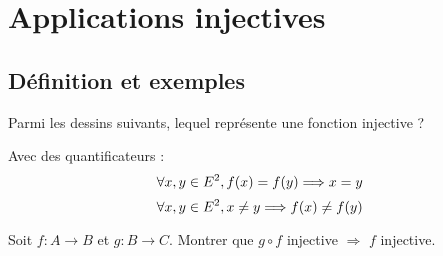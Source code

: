 \documentclass[a4paper, 11pt]{article}
\begin{document}
% 
\section{Applications injectives}

\subsection{D\'efinition et exemples}





\begin{exemple}
	Parmi les dessins suivants, lequel repr\'esente une fonction injective ? \\

\end{exemple}

Avec des quantificateurs :
$$\forall x, y \in E^2, f(x)= f(y) \Longrightarrow x= y$$
$$\forall x, y \in E^2, x\neq y \Longrightarrow f(x)\neq f(y)$$





\begin{exercice}
	Soit $f: A\rightarrow B$ et $g: B\rightarrow C$. Montrer que $g\circ f$ injective $\Rightarrow$ $f$ injective.
\end{exercice}
\end{document}
